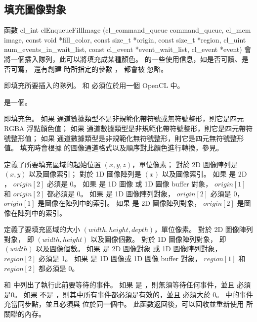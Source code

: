 \subsection{填充圖像對象}

函數
\startclc
cl_int clEnqueueFillImage (cl_command_queue command_queue,
			cl_mem image,
			const void *fill_color,
			const size_t *origin,
			const size_t *region,
			cl_uint num_events_in_wait_list,
			const cl_event *event_wait_list,
			cl_event *event)
\stopclc
會將一個插入隊列，此可以將填充成某種顏色。
  的一些使用信息，如是否可讀、是否可寫，
還有創建  時所指定的參數 ，
都會被  忽略。

 即填充所要插入的隊列。
 和  必須位於用一個 OpenCL 中。

 是一個。

 即填充色。
如果  通道數據類型不是非規範化帶符號或無符號整形，則它是四元 RGBA 浮點顏色值；
如果  通道數據類型是非規範化帶符號整形，則它是四元帶符號整形值；
如果  通道數據類型是非規範化無符號整形，則它是四元無符號整形值。
填充時會根據  的圖像通道格式以及順序對此顏色進行轉換，參見。

 定義了所要填充區域的起始位置 $(x, y, z)$，單位像素；
對於 2D 圖像陣列是 $(x, y)$ 以及圖像索引；
對於 1D 圖像陣列是 $(x)$ 以及圖像索引。
如果  是 2D ， $origin[2]$ 必須是 0。
如果  是 1D 圖像 或 1D 圖像 buffer 對象， $origin[1]$ 和 $origin[2]$ 都必須是 0。
如果  是 1D 圖像陣列對象， $origin[2]$ 必須是 0， $origin[1]$ 是圖像在陣列中的索引。
如果  是 2D 圖像陣列對象， $origin[2]$ 是圖像在陣列中的索引。

 定義了要填充區域的大小 $(width, height, depth)$，單位像素。
對於 2D 圖像陣列對象， 即 $(width, height)$ 以及圖像個數。
對於 1D 圖像陣列對象， 即 $(width)$ 以及圖像個數。
如果  是 2D 圖像對象 或 1D 圖像陣列對象， $region[2]$ 必須是 1。
如果  是 1D 圖像或 1D 圖像 buffer 對象， $region[1]$ 和 $region[2]$ 都必須是 0。

 和  中列出了執行此前要等待的事件。
如果  是 ，則無須等待任何事件，並且  必須是0。
如果  不是 ，則其中所有事件都必須是有效的，並且  必須大於 0。
 中的事件充當同步點，並且必須與  位於同一個中。
此函數返回後，可以回收並重新使用  所關聯的內存。

